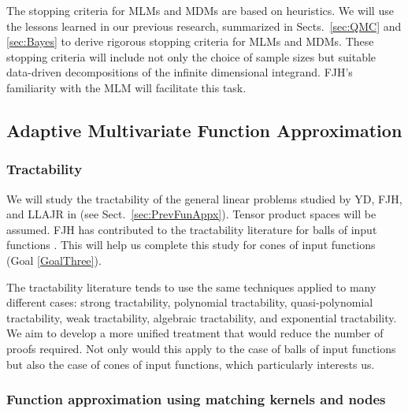 \documentclass[11pt]{NSFamsart}
\begin{document}
The stopping criteria for MLMs and MDMs are based on heuristics.  We will use the lessons learned in our previous research, summarized in  Sects.\ \ref{sec:QMC} and \ref{sec:Bayes} to derive rigorous stopping criteria for MLMs and MDMs. These stopping criteria will include not only the choice of sample sizes but suitable data-driven decompositions of the infinite dimensional integrand.  FJH's familiarity with the MLM \cite{HicMGRitNiu09a, NiuHic09a, 
NiuHic09b} will facilitate this task.

\subsection{Adaptive Multivariate Function Approximation}

\subsubsection{Tractability} \label{sec:tract}

We will study the tractability of the general linear problems studied by YD, FJH, and LLAJR in \cite{DinHic20a} (see Sect.\ \ref{sec:PrevFunAppx}).  Tensor product spaces will be assumed.  FJH has contributed to the tractability literature for balls of input functions
\cite{FasHicWoz12b,WanHic00b,HicWoz00b,HicSloWas03c,HicSloWas03b,HicSloWas03a,HicSloWas03e,HicWasWoz06a,YueHic04a,YueHic05a,ZhoHic15a}.  This will help us complete this study for cones of input functions (Goal \ref{GoalThree}).

The tractability literature tends to use the same techniques applied to many different cases:  strong tractability, polynomial tractability, quasi-polynomial tractability, weak tractability, algebraic tractability, and exponential tractability.  We aim to develop a more unified treatment that would reduce the number of proofs required. Not only would this apply to the case of balls of input functions but also the case of cones of input functions, which particularly interests us.


\subsubsection{Function approximation using matching kernels and nodes}
\end{document}
